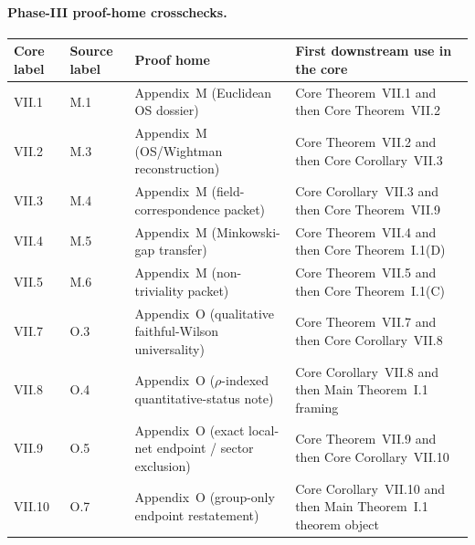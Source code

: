 \documentclass[preprint,aip,jmp,amsmath,amssymb,nofootinbib]{revtex4-2}
\begin{document}
\paragraph{Phase-III proof-home crosschecks.}
\begin{center}
\small
\setlength{\tabcolsep}{4pt}
\renewcommand{\arraystretch}{1.08}
\begin{tabular}{@{}p{0.95cm}p{1.15cm}p{4.1cm}p{4.0cm}@{}}
\toprule
\textbf{Core label} & \textbf{Source label} & \textbf{Proof home} & \textbf{First downstream use in the core}\\
\midrule
VII.1 & M.1 & Appendix~M (Euclidean OS dossier) & Core Theorem~VII.1 and then Core Theorem~VII.2\\
VII.2 & M.3 & Appendix~M (OS/Wightman reconstruction) & Core Theorem~VII.2 and then Core Corollary~VII.3\\
VII.3 & M.4 & Appendix~M (field-correspondence packet) & Core Corollary~VII.3 and then Core Theorem~VII.9\\
VII.4 & M.5 & Appendix~M (Minkowski-gap transfer) & Core Theorem~VII.4 and then Core Theorem~I.1(D)\\
VII.5 & M.6 & Appendix~M (non-triviality packet) & Core Theorem~VII.5 and then Core Theorem~I.1(C)\\
VII.7 & O.3 & Appendix~O (qualitative faithful-Wilson universality) & Core Theorem~VII.7 and then Core Corollary~VII.8\\
VII.8 & O.4 & Appendix~O ($\rho$-indexed quantitative-status note) & Core Corollary~VII.8 and then Main Theorem~I.1 framing\\
VII.9 & O.5 & Appendix~O (exact local-net endpoint / sector exclusion) & Core Theorem~VII.9 and then Core Corollary~VII.10\\
VII.10 & O.7 & Appendix~O (group-only endpoint restatement) & Core Corollary~VII.10 and then Main Theorem~I.1 theorem object\\
\bottomrule
\end{tabular}
\end{center}
\appendix
\setcounter{section}{12}

\setcounter{section}{14}

\SuiteDataAvailabilitySection

\end{document}
